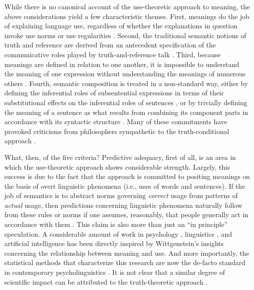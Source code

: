 While there is no canonical account of the use-theoretic approach to meaning, the above considerations yield a few characteristic themes. First, meanings do the job of explaining language use, regardless of whether the explanations in question invoke use norms \citep{Brandom:2000,Brandom:1994} or use regularities \citep{Horwich:2005,Horwich:1998}. Second, the traditional semantic notions of truth and reference are derived from an antecedent specification of the communicative roles played by truth-and-reference talk \citep{Horwich:1998,Horwich:2005,Brandom:2000,Brandom:1994,Brandom:2009}. Third, because meanings are defined in relation to one another, it is impossible to understand the meaning of one expression without understanding the meanings of numerous others \citep{Brandom:1994,Brandom:2000}. Fourth, semantic composition is treated in a non-standard way, either by defining the inferential roles of subsentential expressions in terms of their substitutional effects on the inferential roles of sentences \citep{Brandom:2000,Brandom:1994,Block:1986}, or by trivially defining the meaning of a sentence as what results from combining its component parts in accordance with its syntactic structure \citep{Horwich:2005}. Many of these commitments have provoked criticisms from philosophers sympathetic to the truth-conditional approach \citep{Stanley:2008,Speaks:2014}. 

What, then, of the five criteria? Predictive adequacy, first of all, is an area in which the use-theoretic approach shows considerable strength. Largely, this success is due to the fact that the approach is committed to positing meanings on the basis of overt linguistic phenomena (i.e., uses of words and sentences). If the job of semantics is to abstract norms governing \textit{correct} usage from patterns of \textit{actual} usage, then predictions concerning linguistic phenomena naturally follow from these rules or norms if one assumes, reasonably, that people generally act in accordance with them \cite[see][for disscussion of this ``rationality assumption'']{Dennett:1987,Brandom:1994}. This claim is also more than just an ``in principle'' speculation. A considerable amount of work in psychology \citep[e.g.,][]{FrankGoodman:2012}, linguistics \citep[e.g.,][]{Tomasello:2005,Manning:1999}, and artificial intelligence \citep[e.g.,][]{TurneyPantel:2010} has been directly inspired by Wittgenstein's insights concerning the relationship between meaning and use. And more importantly, the statistical methods that characterize this research are now the de-facto standard in contemporary psycholinguistics \citep{Seidenberg:1997,Christiansen:2015}. It is not clear that a similar degree of scientific impact can be attributed to the truth-theoretic approach \citep[cf.][]{Soames:2010}.

